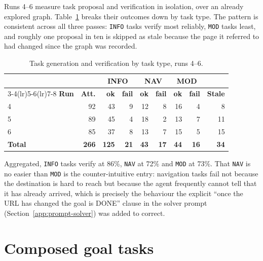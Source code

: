 Runs 4--6 measure task proposal and verification in isolation, over an already
explored graph. Table~\ref{tab:app-gen} breaks their outcomes down by task type.
The pattern is consistent across all three passes: \texttt{INFO} tasks verify
most reliably, \texttt{MOD} tasks least, and roughly one proposal in ten is
skipped as stale because the page it referred to had changed since the graph
was recorded.

\begin{table}[H]
\centering
\caption[Task generation and verification by type]{Task generation and
verification by task type, runs 4--6.}
\label{tab:app-gen}
\small
\begin{tabular}{@{}lrrrrrrrr@{}}
\toprule
& & \multicolumn{2}{c}{\textbf{INFO}} & \multicolumn{2}{c}{\textbf{NAV}} &
\multicolumn{2}{c}{\textbf{MOD}} & \\
\cmidrule(lr){3-4}\cmidrule(lr){5-6}\cmidrule(lr){7-8}
\textbf{Run} & \textbf{Att.} & \textbf{ok} & \textbf{fail} & \textbf{ok} &
\textbf{fail} & \textbf{ok} & \textbf{fail} & \textbf{Stale} \\
\midrule
4 & 92 & 43 &  9 & 12 & 8 & 16 & 4 &  8 \\
5 & 89 & 45 &  4 & 18 & 2 & 13 & 7 & 11 \\
6 & 85 & 37 &  8 & 13 & 7 & 15 & 5 & 15 \\
\midrule
\textbf{Total} & \textbf{266} & \textbf{125} & \textbf{21} & \textbf{43} &
\textbf{17} & \textbf{44} & \textbf{16} & \textbf{34} \\
\bottomrule
\end{tabular}
\end{table}

\noindent
Aggregated, \texttt{INFO} tasks verify at 86\%, \texttt{NAV} at 72\% and
\texttt{MOD} at 73\%. That \texttt{NAV} is no easier than \texttt{MOD} is the
counter-intuitive entry: navigation tasks fail not because the destination is
hard to reach but because the agent frequently cannot tell that it has already
arrived, which is precisely the behaviour the explicit ``once the URL has
changed the goal is DONE'' clause in the solver prompt
(Section~\ref{app:prompt-solver}) was added to correct.

\section{Composed goal tasks}
\label{app:runs-goal}

